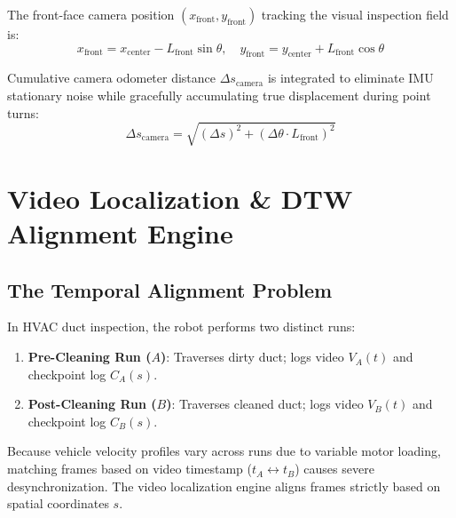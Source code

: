 \documentclass[11pt,a4paper]{article}
\begin{document}
The front-face camera position $(x_{\text{front}}, y_{\text{front}})$ tracking the visual inspection field is:
\begin{equation}
x_{\text{front}} = x_{\text{center}} - L_{\text{front}} \sin\theta, \quad y_{\text{front}} = y_{\text{center}} + L_{\text{front}} \cos\theta
\end{equation}

Cumulative camera odometer distance $\Delta s_{\text{camera}}$ is integrated to eliminate IMU stationary noise while gracefully accumulating true displacement during point turns:
\begin{equation}
\Delta s_{\text{camera}} = \sqrt{(\Delta s)^2 + (\Delta \theta \cdot L_{\text{front}})^2}
\end{equation}

\section{Video Localization \& DTW Alignment Engine}

\subsection{The Temporal Alignment Problem}
In HVAC duct inspection, the robot performs two distinct runs:
\begin{enumerate}
    \item \textbf{Pre-Cleaning Run ($A$)}: Traverses dirty duct; logs video $V_A(t)$ and checkpoint log $C_A(s)$.
    \item \textbf{Post-Cleaning Run ($B$)}: Traverses cleaned duct; logs video $V_B(t)$ and checkpoint log $C_B(s)$.
\end{enumerate}
Because vehicle velocity profiles vary across runs due to variable motor loading, matching frames based on video timestamp ($t_A \leftrightarrow t_B$) causes severe desynchronization. The video localization engine aligns frames strictly based on spatial coordinates $s$.
\end{document}

